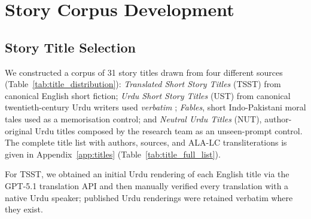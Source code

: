 \documentclass[11pt]{article}
\begin{document}

    
    
    
    
\section{Story Corpus Development}

\subsection{Story Title Selection}
\label{subsec:title_corpus}

We constructed a corpus of 31 story titles drawn
from four different sources
(Table~\ref{tab:title_distribution}): \emph{Translated Short
Story Titles} (TSST) from canonical English short
fiction;
\emph{Urdu Short Story Titles} (UST) from canonical
twentieth-century Urdu writers used \emph{verbatim}
;
\emph{Fables}, short Indo-Pakistani moral tales used
as a memorisation control; and \emph{Neutral Urdu Titles}
(NUT), author-original Urdu titles composed by the
research team as an unseen-prompt control. The complete
title list with authors, sources, and ALA-LC transliterations
is given in Appendix~\ref{app:titles}
(Table~\ref{tab:title_full_list}).

For TSST, we obtained an initial Urdu rendering of each
English title via the GPT-5.1 translation API and then
manually verified every translation with a native Urdu
speaker; published Urdu renderings 
were retained verbatim where they exist.
\end{document}

